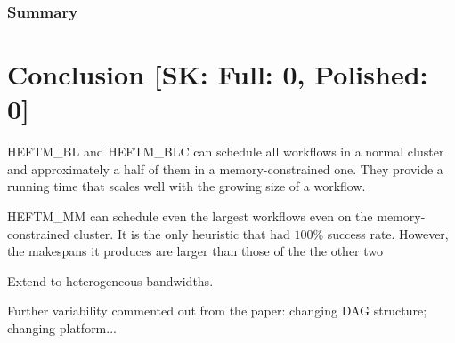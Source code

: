 \documentclass[conference]{IEEEtran}
\newcommand{\algo}[1]{\textsc{#1}}
\newcommand{\heftmm}{\algo{HEFTM\_MM}\xspace}
\newcommand{\heftbl}{\algo{HEFTM\_BL}\xspace}
\newcommand{\heftblc}{\algo{HEFTM\_BLC}\xspace}
\newcommand{\skug}[1]{{\color{blue}[SK: #1]}}
\begin{document}
    \subsubsection{Summary}

\section{Conclusion  \skug{Full: 0, Polished: 0}}
\label{sec:conc}

 \heftbl and \heftblc can schedule all workflows in a normal cluster and approximately a half of them in a memory-constrained
    one.
    They provide a running time that scales well with the growing size of a workflow.

    \heftmm can schedule even the largest workflows even on the memory-constrained cluster.
    It is the only heuristic that had $100\%$ success rate.
    However, the makespans it produces are larger than those of the the other two

Extend to heterogeneous bandwidths. 

Further variability commented out from the paper: changing DAG structure; changing platform...


    
\end{document}
